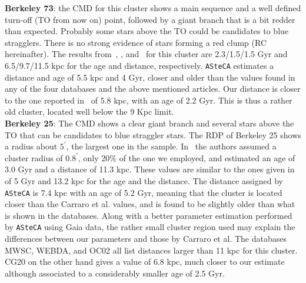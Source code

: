 \documentclass[draft]{aa}
\begin{document}
\begin{appendix}
  \noindent \textbf{Berkeley 73}: the CMD for this cluster shows a main sequence
  and a well defined turn-off (TO from now on) point, followed by a giant branch
  that is a bit redder than expected. Probably some stars above the TO could be
  candidates to blue stragglers. There is no strong evidence of stars forming a
  red clump (RC hereinafter).
  The results from~\cite{Ortolani_2005}, \cite{Carraro_2005},
  and~\cite{Carraro_2007_oldOC} for this cluster are 2.3/1.5/1.5 Gyr and
  6.5/9.7/11.5 kpc for the age and distance, respectively.
  \texttt{ASteCA} estimates a distance and age of 5.5 kpc and 4 Gyr,
  closer and older than the values found in any of the four databases and the
  above mentioned articles. Our distance is closer to the one reported
  in~\cite{Dias_2021} of 5.8 kpc, with an age of 2.2 Gyr. This is thus a
  rather old cluster, located well below the 9 Kpc limit.\\

  \noindent \textbf{Berkeley 25}: The CMD shows a clear giant branch and several stars
  above the TO that can be candidates to blue straggler stars. The RDP of
  Berkeley 25 shows a radius about $5^{\prime}$, the largest one in the sample.
  In~\cite{Carraro_2005} the authors assumed a cluster radius of $0.8^{\prime}$,
  only 20\% of the one we employed, and estimated an age of 3.0 Gyr and a
  distance of 11.3 kpc. These values are similar to the ones given
  in~\cite{Carraro_2007_oldOC} of 5 Gyr and 13.2 kpc for the age and the
  distance.
  The distance assigned by \texttt{ASteCA} is 7.4 kpc with an age of 5.2 Gyr,
  meaning that the cluster is located closer than the Carraro et al.
  values, and is found to be slightly older than what is shown in the
  databases.
  Along with a better parameter estimation performed by \texttt{ASteCA} using
  Gaia data, the rather small cluster region used may explain the differences
  between our parameters and those by Carraro et al. The databases MWSC,
  WEBDA, and OC02 all list distances larger than 11 kpc for this cluster. CG20
  on the other hand gives a value of 6.8 kpc, much closer to our estimate
  although associated to a considerably smaller age of 2.5 Gyr.\\


\end{appendix}
\end{document}
